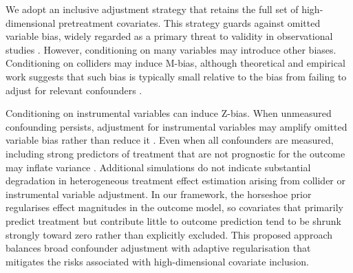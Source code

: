 We adopt an inclusive adjustment strategy that retains the full set of high-dimensional pretreatment covariates. 
This strategy guards against omitted variable bias, widely regarded as a primary threat to validity in observational studies \citep{Rubin2009}. 
However, conditioning on many variables may introduce other biases. 
Conditioning on colliders may induce M-bias, although theoretical and empirical work suggests that such bias is typically small relative to the bias from failing to adjust for relevant confounders \citep{Liu2012Mbias, DingMiratrix2015}. 

Conditioning on instrumental variables can induce Z-bias. 
When unmeasured confounding persists, adjustment for instrumental variables may amplify omitted variable bias rather than reduce it \citep{Ding2017BiasAmplifier}. 
Even when all confounders are measured, including strong predictors of treatment that are not prognostic for the outcome may inflate variance \citep{Myers2011}.
Additional simulations do not indicate substantial degradation in heterogeneous treatment effect estimation arising from collider or instrumental variable adjustment. 
In our framework, the horseshoe prior regularises effect magnitudes in the outcome model, so covariates that primarily predict treatment but contribute little to outcome prediction tend to be shrunk strongly toward zero rather than explicitly excluded.
This proposed approach balances broad confounder adjustment with adaptive regularisation that mitigates the risks associated with high-dimensional covariate inclusion.


